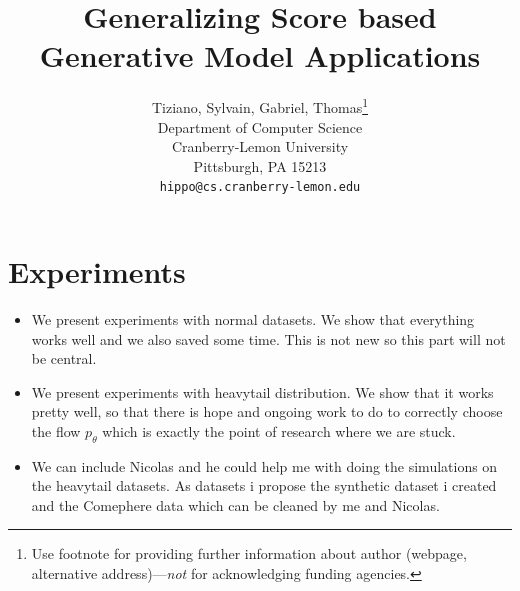 \documentclass{article}
\title{Generalizing Score based Generative Model Applications}
\author{%
Tiziano, Sylvain, Gabriel, Thomas\thanks{Use footnote for providing further information
about author (webpage, alternative address)---\emph{not} for acknowledging
funding agencies.} \\
Department of Computer Science\\
Cranberry-Lemon University\\
Pittsburgh, PA 15213 \\
\texttt{hippo@cs.cranberry-lemon.edu} \\
}
\begin{document}
\theoremstyle{plain}
\newtheorem{theorem}{Theorem}[section]
\newtheorem{proposition}[theorem]{Proposition}
\newtheorem{lemma}[theorem]{Lemma}
\newtheorem{corollary}[theorem]{Corollary}
\theoremstyle{definition}
\newtheorem{definition}[theorem]{Definition}
\newtheorem{assumption}[theorem]{Assumption}
\theoremstyle{remark}
\newtheorem{remark}[theorem]{Remark}
\maketitle


%

\section{Experiments}
\begin{itemize}
    \item We present experiments with normal datasets. We show that everything works well and we also saved some time. This is not new so this part will not be central. 
    \item We present experiments with heavytail distribution. We show that it works pretty well, so that there is hope and ongoing work to do to correctly choose the flow $p_\theta$ which is exactly the point of research where we are stuck. 
    \item We can include Nicolas and he could help me with doing the simulations on the heavytail datasets. As datasets i propose the synthetic dataset i created and the Comephere data which can be cleaned by me and Nicolas. 
\end{itemize}

 

\end{document}
